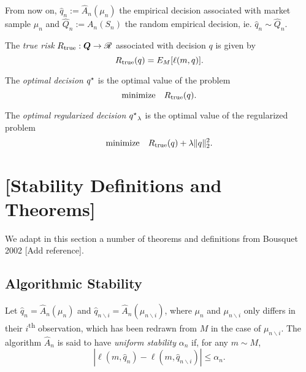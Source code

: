 \documentclass[11pt]{article}
\begin{document}
From now on, $\hat q_n := \hat A_n(\mu_n)$ the empirical decision associated with market sample
$\mu_n$ and $\hat Q_n := A_n(S_n)$ the random empirical decision, ie. $\hat q_n \sim \hat Q_n$.

\begin{deff}
  The \textsl{true risk} $R_{\mathrm{true}}:\bm Q\to\mathscr{R}$ associated with decision $q$ is given by
  \begin{equation*}
    R_{\mathrm{true}}(q) = E_M[\ell(m,q)].
  \end{equation*}
\end{deff}

\begin{deff}
  The \textsl{optimal decision} ${q^\star}$ is the optimal value of the problem
  \begin{equation*}
    \text{minimize}\quad R_{\mathrm{true}}(q).
  \end{equation*}
\end{deff}

\begin{deff}
  The \textsl{optimal regularized decision} ${q^\star}_\lambda$ is the optimal value of the
  regularized problem 
  \begin{equation*}
        \text{minimize}\quad R_{\mathrm{true}}(q) + \lambda\|q\|_2^2.
  \end{equation*}
\end{deff}


\section{[Stability Definitions and Theorems]}

We adapt in this section a number of theorems and definitions from Bousquet 2002 [Add
reference].

\subsection{Algorithmic Stability}

\begin{deff}
  Let $\hat q_n=\hat A_n(\mu_n)$ and
  $\hat q_{n\backslash i}=\hat A_n(\mu_{n\backslash i})$, where $\mu_n$ and
  $\mu_{n\backslash i}$ only differs in their $i$\textsuperscript{th} observation, which
  has been redrawn from $M$ in the case of $\mu_{n\backslash i}$. The algorithm $\hat A_n$
  is said to have \textsl{uniform stability} $\alpha_n$ if, for any $m\sim M$,
  \begin{equation*}
    |\ell(m,\hat q_n) - \ell(m,\hat q_{n\backslash i})| \leq \alpha_n. 
  \end{equation*}
\end{deff}
\end{document}
